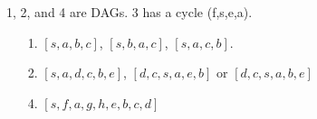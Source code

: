 \vspace{.5em}
\begin{Answer} 1, 2, and 4 are DAGs. 3 has a cycle (f,s,e,a).
\end{Answer}

\vspace{.5em}
\begin{Answer} 
    \begin{itemize}
        \item[1.] $[s,a,b,c]$, $[s,b,a,c]$, $[s,a,c,b]$. 
        \item[2.] $[s,a,d,c,b,e]$, $[d,c,s,a,e,b]$ or $[d,c,s,a,b,e]$
        \item[4.] $[s,f,a,g,h,e,b,c,d]$ 
    \end{itemize}
\end{Answer}

